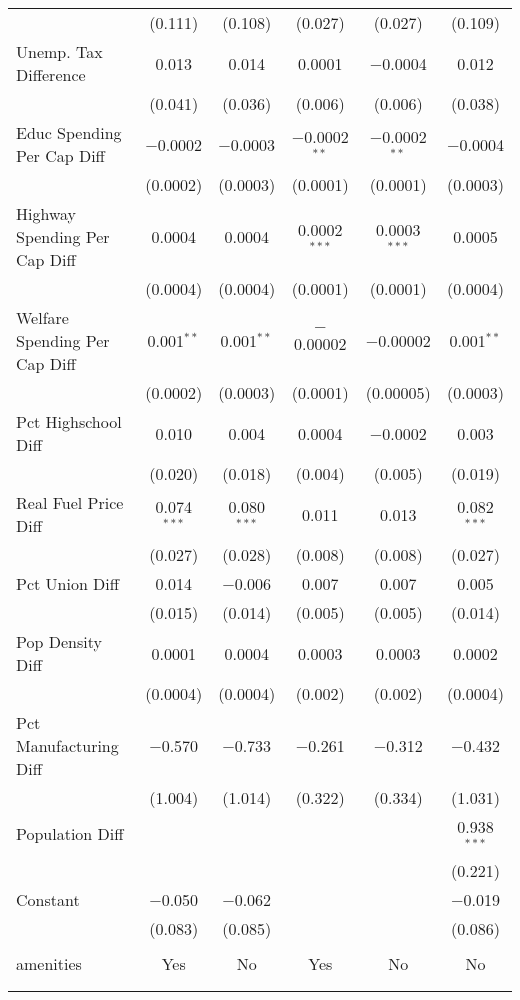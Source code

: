 \begin{table}[!htbp]
\begin{tabular}{@{\extracolsep{5pt}}lccccc}
  & (0.111) & (0.108) & (0.027) & (0.027) & (0.109) \\ 
  Unemp. Tax Difference & 0.013 & 0.014 & 0.0001 & $-$0.0004 & 0.012 \\ 
  & (0.041) & (0.036) & (0.006) & (0.006) & (0.038) \\ 
  Educ Spending Per Cap Diff & $-$0.0002 & $-$0.0003 & $-$0.0002$^{**}$ & $-$0.0002$^{**}$ & $-$0.0004 \\ 
  & (0.0002) & (0.0003) & (0.0001) & (0.0001) & (0.0003) \\ 
  Highway Spending Per Cap Diff & 0.0004 & 0.0004 & 0.0002$^{***}$ & 0.0003$^{***}$ & 0.0005 \\ 
  & (0.0004) & (0.0004) & (0.0001) & (0.0001) & (0.0004) \\ 
  Welfare Spending Per Cap Diff & 0.001$^{**}$ & 0.001$^{**}$ & $-$0.00002 & $-$0.00002 & 0.001$^{**}$ \\ 
  & (0.0002) & (0.0003) & (0.0001) & (0.00005) & (0.0003) \\ 
  Pct Highschool Diff & 0.010 & 0.004 & 0.0004 & $-$0.0002 & 0.003 \\ 
  & (0.020) & (0.018) & (0.004) & (0.005) & (0.019) \\ 
  Real Fuel Price Diff & 0.074$^{***}$ & 0.080$^{***}$ & 0.011 & 0.013 & 0.082$^{***}$ \\ 
  & (0.027) & (0.028) & (0.008) & (0.008) & (0.027) \\ 
  Pct Union Diff & 0.014 & $-$0.006 & 0.007 & 0.007 & 0.005 \\ 
  & (0.015) & (0.014) & (0.005) & (0.005) & (0.014) \\ 
  Pop Density Diff & 0.0001 & 0.0004 & 0.0003 & 0.0003 & 0.0002 \\ 
  & (0.0004) & (0.0004) & (0.002) & (0.002) & (0.0004) \\ 
  Pct Manufacturing Diff & $-$0.570 & $-$0.733 & $-$0.261 & $-$0.312 & $-$0.432 \\ 
  & (1.004) & (1.014) & (0.322) & (0.334) & (1.031) \\ 
  Population Diff &  &  &  &  & 0.938$^{***}$ \\ 
  &  &  &  &  & (0.221) \\ 
  Constant & $-$0.050 & $-$0.062 &  &  & $-$0.019 \\ 
  & (0.083) & (0.085) &  &  & (0.086) \\ 
 \hline \\[-1.8ex] 
amenities & Yes & No & Yes & No & No \\ 
\hline \\[-1.8ex] 
\hline 
\hline \\[-1.8ex] 
\end{tabular} 
\end{table} 
